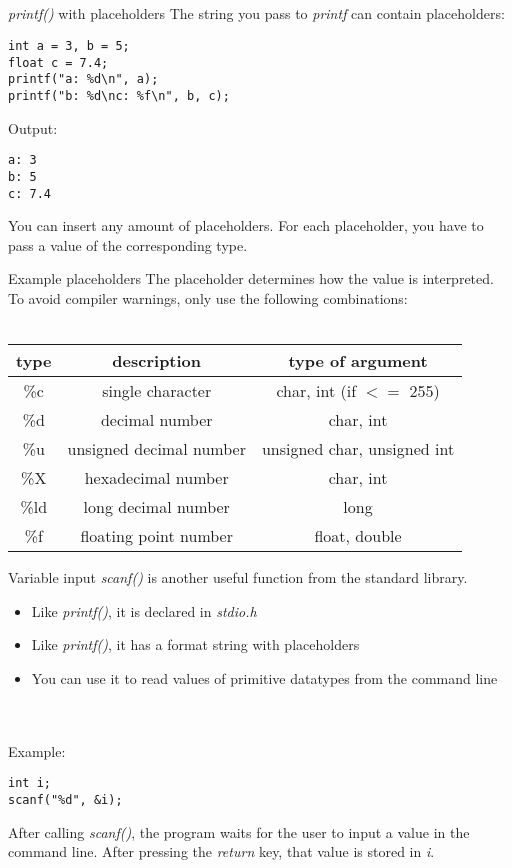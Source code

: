\subsection{}
\begin{frame}[fragile]{\textit{printf()} with placeholders}
	The string you pass to \textit{printf} can contain placeholders:
	\begin{lstlisting}[numbers=none]
int a = 3, b = 5;
float c = 7.4;
printf("a: %d\n", a);
printf("b: %d\nc: %f\n", b, c);
\end{lstlisting}
Output:\begin{lstlisting}[numbers=none]
a: 3
b: 5
c: 7.4
\end{lstlisting}
You can insert any amount of placeholders. For each placeholder, you have to pass a value
 of the corresponding type.
\end{frame}
\begin{frame}{Example placeholders}
	The placeholder determines how the value is interpreted.
	To avoid compiler warnings, only use the following combinations: \\ \ \\
	\begin{tabular}{|c|c|c|}
		\hline
		\textbf{type} & \textbf{description} & \textbf{type of argument} \\\hline
		\%c & single character & char, int (if $<=$ 255) \\\hline
		\%d & decimal number & char, int \\\hline
		\%u & unsigned decimal number & unsigned char, unsigned int \\\hline
		\%X & hexadecimal number & char, int \\\hline
		\%ld & long decimal number & long \\\hline
		\%f & floating point number & float, double \\\hline
	\end{tabular}
\end{frame}
\begin{frame}[fragile]{Variable input}
	\textit{scanf()} is another useful function from the standard library.
	\begin{itemize}
		\item Like \textit{printf()}, it is declared in \textit{stdio.h}
		\item Like \textit{printf()}, it has a format string with placeholders
		\item You can use it to read values of primitive datatypes from the command line
	\end{itemize}
	\ \\ \ \\ Example:
	\begin{lstlisting}[numbers=none]
int i;
scanf("%d", &i);	
\end{lstlisting}
	After calling \textit{scanf()}, the program waits for the user to input a value in the
	 command line.
	After pressing the \textit{return} key, that value is stored in \textit{i}.
\end{frame}
